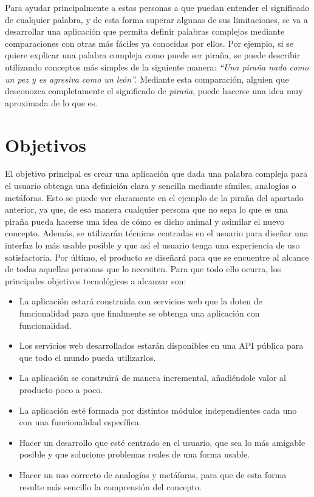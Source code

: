 Para ayudar principalmente a estas personas a que puedan entender el significado de cualquier palabra, y de esta forma superar algunas de sus limitaciones, se va a desarrollar una aplicación que permita definir palabras complejas mediante comparaciones con otras más fáciles ya conocidas por ellos. Por ejemplo, si se quiere explicar una palabra compleja como puede ser piraña, se puede describir utilizando conceptos más simples de la siguiente manera:\textit{ ``Una piraña nada como un pez y es agresiva como un león''.} Mediante esta comparación, alguien que desconozca completamente el significado de \textit{piraña}, puede hacerse una idea muy aproximada de lo que es.


\section{Objetivos}
\label{cap:sec:objetivos}

El objetivo principal es crear una aplicación que dada una palabra compleja para el usuario obtenga una definición clara y sencilla mediante símiles, analogías o metáforas. 
Esto se puede ver claramente en el ejemplo de la piraña del apartado anterior, ya que, de esa manera cualquier persona que no sepa lo que es una piraña pueda hacerse una idea de cómo es dicho animal y asimilar el nuevo concepto. Además, se utilizarán técnicas centradas en el usuario para diseñar una interfaz lo más usable posible y que así el usuario tenga una experiencia de uso satisfactoria. Por último, el producto se diseñará para que se encuentre al alcance de todas aquellas personas que lo necesiten.
 Para que todo ello ocurra, los principales objetivos tecnológicos a alcanzar son:
\begin{itemize}
	\item La aplicación estará construida con servicios web que la doten de funcionalidad para que finalmente se obtenga una aplicación con funcionalidad. 
	\item Los servicios web desarrollados estarán disponibles en una API pública para que todo el mundo pueda utilizarlos.	
	\item La aplicación se construirá de manera incremental, añadiéndole valor al producto poco a poco.	
	\item La aplicación esté formada por distintos módulos independientes cada uno con una funcionalidad específica.
	\item Hacer un desarrollo que esté centrado en el usuario, que sea lo más amigable posible y que solucione problemas reales de una forma usable.
	\item Hacer un uso correcto de analogías y metáforas, para que de esta forma resulte más sencillo la comprensión del concepto.
\end{itemize}

